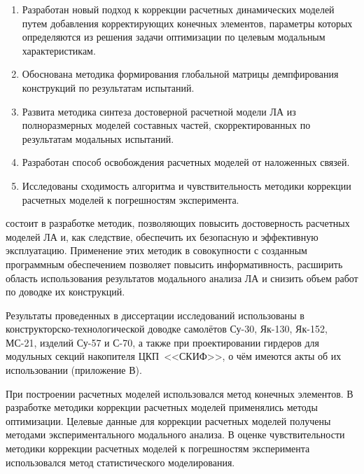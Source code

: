 {\novelty}
\begin{enumerate}[beginpenalty = 10000] 
	\item Разработан новый подход к коррекции расчетных динамических моделей путем добавления корректирующих конечных элементов, параметры которых определяются из решения задачи оптимизации по целевым модальным характеристикам.
	\item Обоснована методика формирования глобальной матрицы демпфирования конструкций по результатам испытаний.
	\item Развита методика синтеза достоверной расчетной модели ЛА из полноразмерных моделей составных частей, скорректированных по результатам модальных испытаний.
	\item Разработан способ освобождения расчетных моделей от наложенных связей.
	\item Исследованы сходимость алгоритма и чувствительность методики коррекции расчетных моделей к погрешностям эксперимента. 
\end{enumerate}

{\influence} состоит в разработке методик, позволяющих повысить достоверность расчетных моделей ЛА и, как следствие, обеспечить их безопасную и эффективную эксплуатацию.  Применение этих методик в совокупности с созданным программным обеспечением позволяет повысить информативность, расширить область использования результатов модального анализа ЛА и снизить объем работ по доводке их конструкций.

Результаты проведенных в диссертации исследований использованы в конструкторско-технологической доводке самолётов \mbox{Су-30}, \mbox{Як-130}, \mbox{Як-152}, \mbox{МС-21}, изделий \mbox{Су-57} и \mbox{С-70}, а также при проектировании гирдеров для модульных секций накопителя ЦКП~<<СКИФ>>, о чём имеются акты об их использовании (приложение В). 

{\methods}

При построении расчетных моделей использовался метод конечных элементов. В разработке методики коррекции расчетных моделей применялись методы оптимизации. Целевые данные для коррекции расчетных моделей получены методами экспериментального модального анализа. В оценке чувствительности методики коррекции расчетных моделей к погрешностям эксперимента использовался метод статистического моделирования.  


